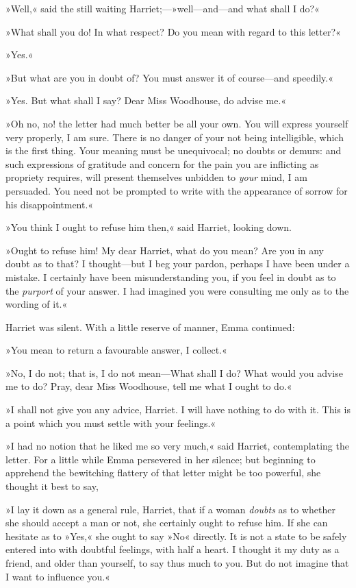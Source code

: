 »Well,« said the still waiting Harriet;—»well—and—and what shall I do?«

»What shall you do! In what respect? Do you mean with regard to this letter?«

»Yes.«

»But what are you in doubt of? You must answer it of course—and speedily.«

»Yes. But what shall I say? Dear Miss Woodhouse, do advise me.«

»Oh no, no! the letter had much better be all your own. You will express yourself very properly, I am sure. There is no danger of your not being intelligible, which is the first thing. Your meaning must be unequivocal; no doubts or demurs: and such expressions of gratitude and concern for the pain you are inflicting as propriety requires, will present themselves unbidden to \textit{your} mind, I am persuaded. You need not be prompted to write with the appearance of sorrow for his disappointment.«

»You think I ought to refuse him then,« said Harriet, looking down.

»Ought to refuse him! My dear Harriet, what do you mean? Are you in any doubt as to that? I thought—but I beg your pardon, perhaps I have been under a mistake. I certainly have been misunderstanding you, if you feel in doubt as to the \textit{purport} of your answer. I had imagined you were consulting me only as to the wording of it.«

Harriet was silent. With a little reserve of manner, Emma continued:

»You mean to return a favourable answer, I collect.«

»No, I do not; that is, I do not mean—What shall I do? What would you advise me to do? Pray, dear Miss Woodhouse, tell me what I ought to do.«

»I shall not give you any advice, Harriet. I will have nothing to do with it. This is a point which you must settle with your feelings.«

»I had no notion that he liked me so very much,« said Harriet, contemplating the letter. For a little while Emma persevered in her silence; but beginning to apprehend the bewitching flattery of that letter might be too powerful, she thought it best to say,

»I lay it down as a general rule, Harriet, that if a woman \textit{doubts} as to whether she should accept a man or not, she certainly ought to refuse him. If she can hesitate as to »Yes,« she ought to say »No« directly. It is not a state to be safely entered into with doubtful feelings, with half a heart. I thought it my duty as a friend, and older than yourself, to say thus much to you. But do not imagine that I want to influence you.«

